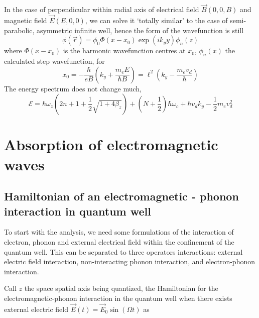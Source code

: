 \documentclass{article}
\begin{document}
In the case of perpendicular within radial axis of electrical field $\vec{B}(0,0,B)$ and magnetic field $\vec{E}(E,0,0)$, we can solve it `totally similar' to the case of semi-parabolic, asymmetric infinite well, hence the form of the wavefunction is still
\begin{equation} 
    \phi(\vec{r}) = \phi_{0}\Phi(x-x_0)\exp{(ik_{y}y)}\phi_{n}(z)
\end{equation}
where $\Phi(x-x_0)$ is the harmonic wavefunction centres at $x_{0}$, $\phi_{n}(x)$ the calculated step wavefunction, for \begin{equation}
    x_{0} = -\frac{\hbar}{eB} \left( k_{y} + \frac{m_{e}E}{\hbar B} \right) = \ell^{2} \left(k_y - \frac{m_e v_{d}}{\hbar}\right)
\end{equation}
The energy spectrum does not change much, 
\begin{equation}
    \mathcal{E} = \hbar \omega_{z} \left( 2n+1 + \frac{1}{2}\sqrt{1+4\beta_{z}} \right) + \left(N+\frac{1}{2}\right)\hbar \omega_{c} + \hbar v_{d} k_{y} - \frac{1}{2} m_{e}v_{d}^{2}
\end{equation}
\section{Absorption of electromagnetic waves}

\subsection{Hamiltonian of an electromagnetic - phonon interaction in quantum well}

To start with the analysis, we need some formulations of the interaction of electron, phonon and external electrical field within the confinement of the quantum well. This can be separated to three operators interactions: external electric field interaction, non-interacting phonon interaction, and electron-phonon interaction. 

Call $z$ the space spatial axis being quantized, the Hamiltonian for the electromagnetic-phonon interaction in the quantum well when there exists external electric field $\vec{E}(t)=\vec{E}_{0}\sin{(\Omega t)}$ as 
\end{document}
